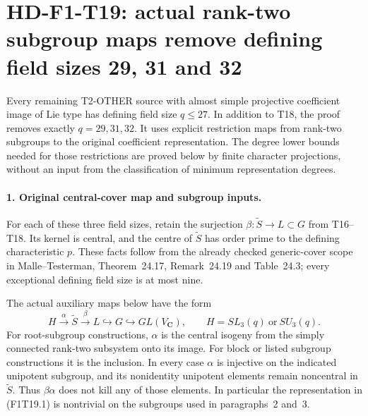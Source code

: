 \section[HD-F1-T19: defining fields at most 27]{HD-F1-T19: actual rank-two subgroup maps remove defining field sizes 29, 31 and 32}
\label{sec:f1-rank-two-subgroup-field-exclusion}

Every remaining T2-OTHER source with almost simple projective
coefficient image of Lie type has defining field size
\(q\le27\). In addition to T18, the proof removes exactly
\(q=29,31,32\). It uses explicit restriction maps from
rank-two subgroups to the original coefficient representation.
The degree lower bounds needed for those restrictions are
proved below by finite character projections, without an
input from the classification of minimum representation degrees.

\paragraph{1. Original central-cover map and subgroup inputs.}
For each of these three field sizes, retain the surjection
\(\beta:\widetilde S\to L\subset G\) from T16--T18.
Its kernel is central, and the centre of \(\widetilde S\)
has order prime to the defining characteristic \(p\).
These facts follow from the already checked generic-cover
scope in Malle--Testerman, Theorem~24.17,
Remark~24.19 and Table~24.3; every exceptional defining
field size is at most nine.

The actual auxiliary maps below have the form
\[
 H\xrightarrow{\alpha}\widetilde S
    \xrightarrow{\beta}L\hookrightarrow G
    \hookrightarrow GL(V_{\mathbf C}),
 \qquad H=SL_3(q)\ \text{or}\ SU_3(q).
 \tag{F1T19.1}
\]
For root-subgroup constructions, \(\alpha\) is the
central isogeny from the simply connected rank-two
subsystem onto its image. For block or listed subgroup
constructions it is the inclusion. In every case
\(\alpha\) is injective on the indicated unipotent
subgroup, and its nonidentity unipotent elements remain
noncentral in \(\widetilde S\). Thus \(\beta\alpha\)
does not kill any of those elements. In particular the
representation in (F1T19.1) is nontrivial on the subgroups
used in paragraphs~2 and~3.

